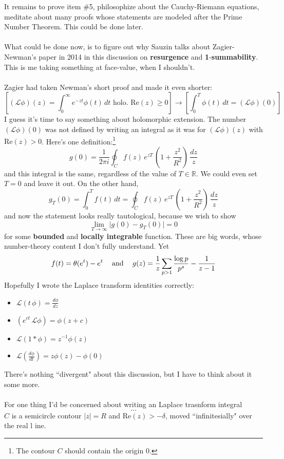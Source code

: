\documentclass[12pt]{article}
\begin{document}
It remains to prove item \#5, philosophize about the Cauchy-Riemann equations, meditate about many proofs whose statements are modeled after the Prime Number Theorem.  This could be done later. \\ \\
What could be done now, is to figure out why Sauzin talks about Zagier-Newman's paper in 2014 in this discussion on {\color{red!50!green!50!orange}\textbf{resurgence}} and {\color{blue!80!white}\textbf{1}}-{\color{blue!80!white}\textbf{summability}}.  This is me taking something at face-value, when I shouldn't. \\ \\
Zagier had taken Newman's short proof and made it even shorter:
$$ \left[ (\mathcal{L}\phi )(z) = \int_0^\infty e^{-z t }\phi(t) \, dt \text{ holo. }\mathrm{Re}(z) \geq 0 \right]\to \left[  \int_0^T \phi(t) \, dt = (\mathcal{L}\phi)(0)\right]  $$
I guess it's time to say something about {\color{green!50!orange}holomorphic extension}. The number $(\mathcal{L}\phi)(0)$ was not defined by writing an integral as it was for $(\mathcal{L}\phi)(z)$ with $\mathrm{Re}(z) > 0$.  Here's one definition:\footnote{The contour $C$ should contain the origin $0$.}
$$ g(0) = \frac{1}{2\pi i } \oint_C f(z) \, e^{zT} \, \left( 1 + \frac{z^2}{R^2} \right) \, \frac{dz}{z}  $$
and this integral is the same, regardless of the value of $T \in \mathbb{R}$.  We could even set $T = 0$ and leave it out.  On the other hand, 
$$ g_T(0) = \int_0^T f(t) \, dt = \oint_C f(z) \, e^{zT} \, \left( 1 + \frac{z^2}{R^2} \right) \, \frac{dz}{z} $$
and now the statement looks really tautological, because we wish to show
$$ \lim_{T \to \infty} \big| g(0) - g_T(0) \big|  = 0 $$
for some \textbf{bounded} and \textbf{locally integrable} function.  These are big words, whose number-theory content I don't fully understand.  Yet
$$ f(t) = \theta(e^t) - e^t \hspace{0.125in}\text{ and }\hspace{0.125in}
g(z) = \frac{1}{z}\sum_{p > 1} \frac{\log p}{p^s}  - \frac{1}{z-1}$$
Hopefully I wrote the Laplace transform identities correctly:
\begin{itemize}
\item $\displaystyle \mathcal{L}(t \,\phi) = \frac{d\phi }{dz}$
\item $\displaystyle (e^{ct} \,\mathcal{L}\phi)  = \phi(z + c)$ 
\item $\displaystyle \mathcal{L}(1 * \phi) = z^{-1}\phi(z) $ 
\item $\displaystyle \mathcal{L}\left( \frac{d\phi}{dt} \right) = z \phi(z) - \phi(0) $ 
\end{itemize}
There's nothing ``divergent" about this discussion, but I have to think about it some more. \\ \\
For one thing I'd be concerned about writing an Laplace trasnform integral
$$ \dots $$
$C$ is a semicircle contour $|z| = R$ and $\mathrm{Re}(z) > -\delta$, moved ``infinitesially" over the real l ine.
\end{document}
